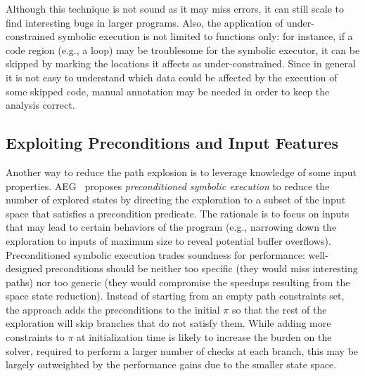 Although this technique is not sound as it may miss errors, it can still scale to find interesting bugs in larger programs. Also, the application of under-constrained symbolic execution is not limited to functions only: for instance, if a code region (e.g., a loop) may be troublesome for the symbolic executor, it can be skipped by marking the locations it affects as under-constrained. Since in general it is not easy to understand which data could be affected by the execution of some skipped code, manual annotation may be needed in order to keep the analysis correct.

\subsection{Exploiting Preconditions and Input Features}%
\label{precontioned-symbolic-execution}

Another way to reduce the path explosion is to leverage knowledge of some input properties. {\sc AEG}~\cite{AEG-NDSS11} proposes {\em preconditioned symbolic execution} to reduce the number of explored states by directing the exploration to a subset of the input space that satisfies a precondition predicate. The rationale is to focus on inputs that may lead to certain behaviors of the program (e.g., narrowing down the exploration to inputs of maximum size to reveal potential buffer overflows). Preconditioned symbolic execution trades soundness for performance: well-designed preconditions should  be neither too specific (they would miss interesting paths) nor too generic (they would compromise the speedups resulting from the space state reduction). Instead of starting from an empty path constraints set, the approach adds the preconditions to the initial $\pi$ so that the rest of the exploration will skip branches that do not satisfy them. While adding more constraints to $\pi$ at initialization time is likely to increase the burden on the solver, required to perform a larger number of checks at each branch, this may be largely outweighted by the performance gains due to the smaller state space.

%


